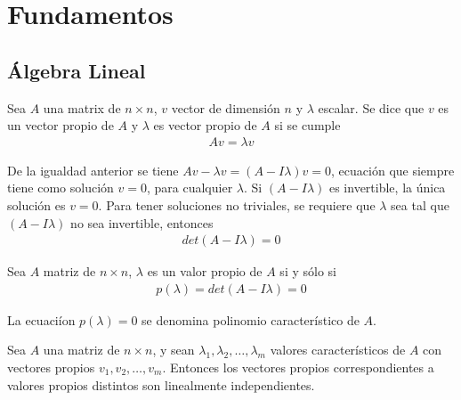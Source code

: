 
\section{Fundamentos}

\subsection{\'Algebra Lineal}

\begin{Def}
Sea $A$ una matrix de $n\times n$, $v$ vector de dimensi\'on $n$ y $\lambda$ escalar. Se dice que $v$ es un vector propio de $A$ y $\lambda$ es vector propio de $A$ si se cumple
\begin{eqnarray*}
Av=\lambda v
\end{eqnarray*}
\end{Def}

\begin{Note}
De la igualdad anterior se tiene $Av-\lambda v=\left(A-I\lambda\right)v=0$, ecuaci\'on que siempre tiene como  soluci\'on $v=0$, para cualquier $\lambda$. Si $\left(A-I\lambda\right)$ es invertible, la \'unica soluci\'on es $v=0$. Para tener soluciones no triviales, se requiere que $\lambda$ sea tal que  $\left(A-I\lambda\right)$ no sea invertible, entonces
\begin{eqnarray*}
det\left(A-I\lambda\right)=0
\end{eqnarray*}
\end{Note}

\begin{Teo}
Sea $A$ matriz de $n\times n$, $\lambda$ es un valor propio de $A$ si y s\'olo si
\begin{eqnarray*}
p\left(\lambda\right)=det\left(A-I\lambda\right)=0
\end{eqnarray*}
\end{Teo}

\begin{Def}
La ecuaci\'ion $p\left(\lambda\right)=0$ se denomina polinomio caracter\'istico de $A$.
\end{Def}


\begin{Teo}
Sea $A$ una matriz de $n\times n$, y sean $\lambda_{1},\lambda_{2},\dots,\lambda_{m}$ valores caracter\'isticos de $A$ con vectores propios $v_{1},v_{2},\dots,v_{m}$. Entonces los vectores propios correspondientes a valores propios distintos son linealmente independientes.
\end{Teo}

